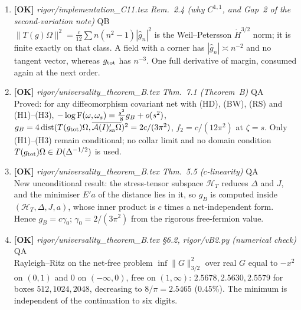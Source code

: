 \documentclass[11pt]{article}
\begin{document}
\begin{enumerate}[leftmargin=1.6em,itemsep=6pt]
\item \textbf{[OK]} \emph{rigor/implementation\_C11.tex Rem.~2.4 (why \(C^{1,1}\), and Gap~2 of the second-variation note)} \hfill\textsc{QB}\\ \(\lVert T(g)\Omega\rVert^2=\tfrac c{12}\sum n(n^2-1)|\hat g_n|^2\) is the Weil--Petersson \(\dot H^{3/2}\) norm; it is finite exactly on that class. A field with a corner has \(|\hat g_n|\asymp n^{-2}\) and no tangent vector, whereas \(g_{\rm tot}\) has \(n^{-3}\). One full derivative of margin, consumed again at the next order.
\item \textbf{[OK]} \emph{rigor/universality\_theorem\_B.tex Thm.~7.1 (Theorem~B)} \hfill\textsc{QA}\\ Proved: for any diffeomorphism covariant net with (HD), (BW), (RS) and (H1)--(H3), \(-\log\operatorname{F}(\omega,\omega_s)=\frac{s^2}{8}g_B+o(s^2)\), \(g_B=4\operatorname{dist}(T(g_{\rm tot})\Omega,\overline{\mathcal A(I)'_{\rm sa}\Omega})^2=2c/(3\pi^2)\), \(f_2=c/(12\pi^2)\) at \(\zeta=s\). Only (H1)--(H3) remain conditional; no collar limit and no domain condition \(T(g_{\rm tot})\Omega\in D(\Delta^{-1/2})\) is used.
\item \textbf{[OK]} \emph{rigor/universality\_theorem\_B.tex Thm.~5.5 (\(c\)-linearity)} \hfill\textsc{QA}\\ New unconditional result: the stress-tensor subspace \(\mathcal H_T\) reduces \(\Delta\) and \(J\), and the minimiser \(E'a\) of the distance lies in it, so \(g_B\) is computed inside \((\mathcal H_T,\Delta,J,a)\), whose inner product is \(c\) times a net-independent form. Hence \(g_B=c\gamma_0\); \(\gamma_0=2/(3\pi^2)\) from the rigorous free-fermion value.
\item \textbf{[OK]} \emph{rigor/universality\_theorem\_B.tex \S6.2, rigor/vB2.py (numerical check)} \hfill\textsc{QA}\\ Rayleigh--Ritz on the net-free problem \(\inf\lVert G\rVert_{3/2}^2\) over real \(G\) equal to \(-x^2\) on \((0,1)\) and \(0\) on \((-\infty,0)\), free on \((1,\infty)\): \(2.5678,2.5630,2.5579\) for boxes \(512,1024,2048\), decreasing to \(8/\pi=2.5465\) (0.45\%). The minimum is independent of the continuation to six digits.

\end{enumerate}
\end{document}
